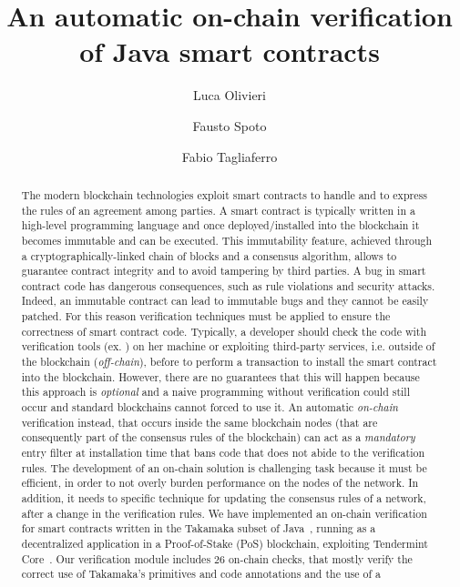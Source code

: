 \documentclass{easychair}
\title{An automatic on-chain verification of Java smart contracts}
\author{
Luca Olivieri\inst{1,2}
\and
Fausto Spoto\inst{1}
\and
Fabio Tagliaferro\inst{1}
}
\institute{
  Università degli Studi di Verona, Italy\\
  \email{\{luca.olivieri, fausto.spoto, fabio.tagliaferro\}@univr.it}
\and
   Corvallis S.r.l., Padova, Italy\\
 }
\begin{document}
\maketitle

\begin{abstract}

  The modern blockchain technologies exploit smart contracts to handle and to express the rules of an agreement among parties.
  A smart contract is typically written in a high-level programming language and once deployed/installed into the blockchain 
  it becomes immutable and can be executed. This immutability feature, achieved through a cryptogra\-phically-linked chain of blocks and a consensus algorithm, 
  allows to guarantee contract integrity and to avoid tampering by third parties. A bug in smart contract code has dangerous consequences, such as rule violations 
  and security attacks. Indeed, an immutable contract can lead to immutable bugs and they cannot be easily patched.
  For this reason verification techniques must be applied to ensure the correctness of smart contract code. Typically, a developer should check the code with 
  verification tools (ex. \cite{TIGR21, GriecoSCFG20, FeistGG19}) on her machine or exploiting third-party services, i.e. outside of the blockchain (\emph{off-chain}), before to perform a transaction to 
  install the smart contract into the blockchain. However, there are no guarantees that this will happen because this approach is \emph{optional} and a naive 
   programming without verification could still occur and standard blockchains cannot forced to use it. An automatic \emph{on-chain} verification 
  instead, that occurs inside the same blockchain nodes (that are consequently part of the consensus rules of the blockchain) can act as a \emph{mandatory} entry filter at installation time
  that bans code that does not abide to the verification rules. The development of an on-chain solution is 
  challenging task because it must be efficient, in order to not overly burden performance on the nodes of the network. In addition, it needs to specific technique 
  for updating the consensus rules of a network, after a change in the verification rules. We have implemented an on-chain verification for smart contracts written 
  in the Takamaka subset of Java~\cite{Spoto19}, running as a decentralized application in a Proof-of-Stake (PoS) blockchain, exploiting Tendermint Core~\cite{tendermintcore}. 
  Our verification module includes $26$ on-chain checks, that mostly verify the correct use of Takamaka's primitives and code annotations and the use of a 

\end{abstract}
\end{document}
